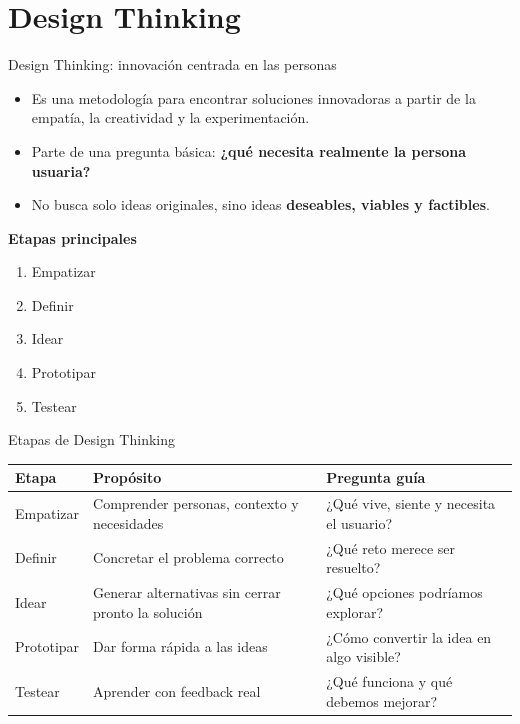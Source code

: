 \documentclass{beamer}
\begin{document}
\section{Design Thinking}

\begin{frame}{Design Thinking: innovación centrada en las personas}
\begin{itemize}
    \item Es una metodología para encontrar soluciones innovadoras a partir de la empatía, la creatividad y la experimentación.
    \item Parte de una pregunta básica: \textbf{¿qué necesita realmente la persona usuaria?}
    \item No busca solo ideas originales, sino ideas \textbf{deseables, viables y factibles}.
\end{itemize}

\vspace{0.3cm}
\textbf{Etapas principales}
\begin{enumerate}
    \item Empatizar
    \item Definir
    \item Idear
    \item Prototipar
    \item Testear
\end{enumerate}
\end{frame}

\begin{frame}{Etapas de Design Thinking}
\small
\begin{tabularx}{\textwidth}{>{\RaggedRight\arraybackslash}p{} X >{\RaggedRight\arraybackslash}p{}}
\toprule
\textbf{Etapa} & \textbf{Propósito} & \textbf{Pregunta guía} \\
\midrule
Empatizar & Comprender personas, contexto y necesidades & ¿Qué vive, siente y necesita el usuario? \\
Definir & Concretar el problema correcto & ¿Qué reto merece ser resuelto? \\
Idear & Generar alternativas sin cerrar pronto la solución & ¿Qué opciones podríamos explorar? \\
Prototipar & Dar forma rápida a las ideas & ¿Cómo convertir la idea en algo visible? \\
Testear & Aprender con feedback real & ¿Qué funciona y qué debemos mejorar? \\
\bottomrule
\end{tabularx}
\end{frame}
\end{document}
